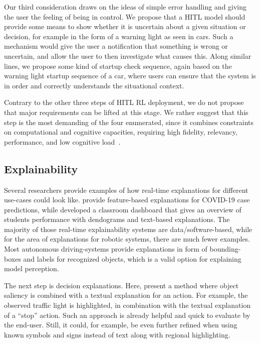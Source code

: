 \documentclass[twoside,11pt]{article}
\begin{document}
\begin{enumerate}
Our third consideration draws on the ideas of simple error handling and giving the user the feeling of being in control. We propose that a HITL model should provide some means to show whether it is uncertain about a given situation or decision, for example in the form of a warning light as seen in cars. Such a mechanism would give the user a notification that something is wrong or uncertain, and allow the user to then investigate what causes this.  Along similar lines, we propose some kind of startup check sequence, again based on the warning light startup sequence of a car, where users can ensure that the system is in order and correctly understands the situational context.

Contrary to the other three steps of HITL RL deployment, we do not propose that major requirements can be lifted at this stage. We rather suggest that this step is the most demanding of the four enumerated, since it combines constraints on computational and cognitive capacities, requiring high fidelity, relevancy, performance, and low cognitive load~\citep{milani2022survey}.

\subsection{Explainability}

Several researchers provide examples of how real-time explanations for different use-cases could look like. \citet{RodriguezEtAl:2021:DeepCovidxAI} provide feature-based explanations for COVID-19 case predictions, while \citet{Kulkarni:2021:EducationAIDashboard} developed a classroom dashboard that gives an overview of students performance with dendograms and text-based explanations. The majority of those real-time explainability systems are data/software-based, while for the area of explanations for robotic systems, there are much fewer examples. Most autonomous driving-systems provide explanations in form of bounding-boxes and labels for recognized objects, which is a valid option for explaining model perception. 

The next step is decision explanations. Here, \citet{Ben-YounesEtAl:2022:DrivingBehaviorEx} present a method where object saliency is combined with a textual explanation for an action. For example, the observed traffic light is highlighted, in combination with the textual explanation of a ``stop'' action. Such an approach is already helpful and quick to evaluate by the end-user. Still, it could, for example, be even further refined when using known symbols and signs instead of text along with regional highlighting.


\end{enumerate}
\end{document}

